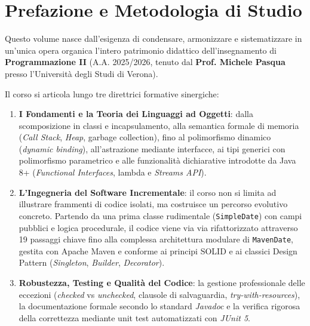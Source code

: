 \documentclass[11pt,a4paper,oneside]{report}
\begin{document}
\setcounter{page}{1}

\chapter*{Prefazione e Metodologia di Studio}

Questo volume nasce dall'esigenza di condensare, armonizzare e sistematizzare in un'unica opera organica l'intero patrimonio didattico dell'insegnamento di \textbf{Programmazione II} (A.A. 2025/2026, tenuto dal \textbf{Prof. Michele Pasqua} presso l'Università degli Studi di Verona).

Il corso si articola lungo tre direttrici formative sinergiche:
\begin{enumerate}
  \item \textbf{I Fondamenti e la Teoria dei Linguaggi ad Oggetti}: dalla scomposizione in classi e incapsulamento, alla semantica formale di memoria (\emph{Call Stack}, \emph{Heap}, garbage collection), fino al polimorfismo dinamico (\emph{dynamic binding}), all'astrazione mediante interfacce, ai tipi generici con polimorfismo parametrico e alle funzionalità dichiarative introdotte da Java 8+ (\emph{Functional Interfaces}, lambda e \emph{Streams API}).
  \item \textbf{L'Ingegneria del Software Incrementale}: il corso non si limita ad illustrare frammenti di codice isolati, ma costruisce un percorso evolutivo concreto. Partendo da una prima classe rudimentale (\texttt{SimpleDate}) con campi pubblici e logica procedurale, il codice viene via via rifattorizzato attraverso 19 passaggi chiave fino alla complessa architettura modulare di \texttt{MavenDate}, gestita con Apache Maven e conforme ai principi SOLID e ai classici Design Pattern (\emph{Singleton}, \emph{Builder}, \emph{Decorator}).
  \item \textbf{Robustezza, Testing e Qualità del Codice}: la gestione professionale delle eccezioni (\emph{checked} vs \emph{unchecked}, clausole di salvaguardia, \emph{try-with-resources}), la documentazione formale secondo lo standard \emph{Javadoc} e la verifica rigorosa della correttezza mediante unit test automatizzati con \emph{JUnit 5}.
\end{enumerate}
\end{document}
